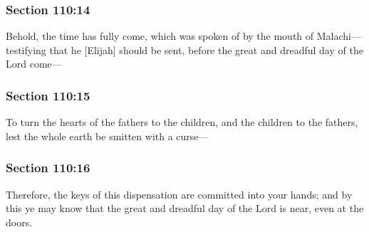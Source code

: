 	\subsubsection{Section 110:14} %
		\label{DC110-14}

		Behold, the time has fully come, which was spoken of by the mouth of Malachi---testifying that he [Elijah] should be sent, before the great and dreadful day of the Lord come---


	\subsubsection{Section 110:15} %
		\label{DC110-15}

		To turn the hearts of the fathers to the children, and the children to the fathers, lest the whole earth be smitten with a curse---


	\subsubsection{Section 110:16} %
		\label{DC110-16}

		Therefore, the keys of this dispensation are committed into your hands; and by this ye may know that the great and dreadful day of the Lord is near, even at the doors.

